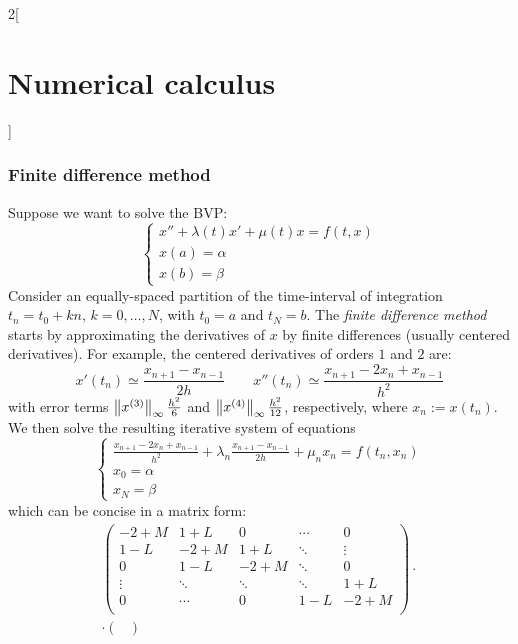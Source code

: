 \documentclass[../../../main_math.tex]{subfiles}
\begin{document}
\begin{multicols}{2}[\section{Numerical calculus}]
  \subsubsection{Finite difference method}
  \begin{definition}
    Suppose we want to solve the BVP:
    \begin{equation}\label{NC:eq_finitediff}
      \begin{cases}
        x'' + \lambda(t) x'+\mu(t) x=f(t, x) \\
        x(a)=\alpha                          \\
        x(b)=\beta
      \end{cases}
    \end{equation}
    Consider an equally-spaced partition of the time-interval of integration $t_n= t_0+kn$, $k=0,\ldots,N$, with $t_0=a$ and $t_N=b$. The \emph{finite difference method} starts by approximating the derivatives of $x$ by finite differences (usually centered derivatives). For example, the centered derivatives of orders $1$ and $2$ are:
    $$
      x'(t_n)\simeq\frac{x_{n+1}-x_{n-1}}{2h}\qquad x''(t_n)\simeq\frac{x_{n+1}-2x_n+x_{n-1}}{h^2}
    $$
    with error terms $\left\|x^{(3)}\right\|_\infty\frac{h^2}{6}$ and $\left\|x^{(4)}\right\|_\infty \frac{h^2}{12}$, respectively, where $x_n:=x(t_n)$. We then solve the resulting iterative system of equations
    $$
      \begin{cases}
        \displaystyle\frac{x_{n+1}-2x_n+x_{n-1}}{h^2} \!+\! \lambda_n \frac{x_{n+1}-x_{n-1}}{2h}\!+\!\mu_n x_n\!=\!f(t_n, x_n) \\
        x_0=\alpha                                                                                                             \\
        x_N=\beta
      \end{cases}
    $$
    which can be concise in a matrix form:
    \begin{multline*}
      \begin{pmatrix}
        -2+M   & 1+ L   & 0      & \cdots & 0      \\
        1-L    & -2+M   & 1+L    & \ddots & \vdots \\
        0      & 1-L    & -2+M   & \ddots & 0      \\
        \vdots & \ddots & \ddots & \ddots & 1+L    \\
        0      & \cdots & 0      & 1-L    & -2+M   \\
      \end{pmatrix}\cdot\\\cdot\begin{pmatrix}

\end{pmatrix}
\end{multline*}
\end{definition}
\end{multicols}
\end{document}
